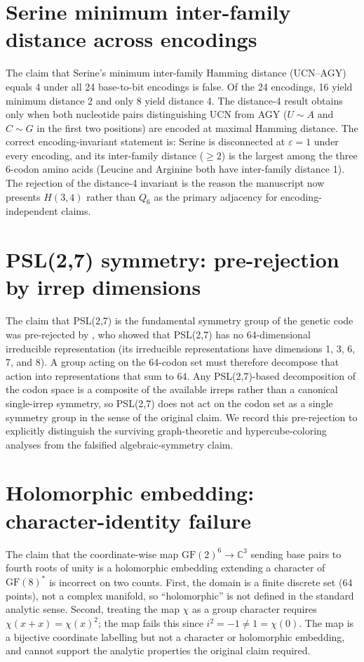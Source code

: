 \documentclass[preprint,11pt,authoryear,a4paper]{elsarticle}
\begin{document}
\section{Serine minimum inter-family distance across
encodings}\label{sec:s-serine-dist}

The claim that Serine's minimum inter-family Hamming distance (UCN--AGY)
equals 4 under all 24 base-to-bit encodings is false. Of the 24
encodings, 16 yield minimum distance 2 and only 8 yield distance 4. The
distance-4 result obtains only when both nucleotide pairs distinguishing
UCN from AGY (\(U \sim A\) and \(C \sim G\) in the first two positions)
are encoded at maximal Hamming distance. The correct encoding-invariant
statement is: Serine is disconnected at \(\varepsilon = 1\) under every
encoding, and its inter-family distance (\(\geq 2\)) is the largest
among the three 6-codon amino acids (Leucine and Arginine both have
inter-family distance 1). The rejection of the distance-4 invariant is
the reason the manuscript now presents \(H(3,4)\) rather than \(Q_{6}\)
as the primary adjacency for encoding-independent claims.

\section{PSL(2,7) symmetry: pre-rejection by irrep
dimensions}\label{sec:s-psl}

The claim that PSL(2,7) is the fundamental symmetry group of the genetic
code was pre-rejected by \citep{antoneli2011}, who showed that PSL(2,7)
has no 64-dimensional irreducible representation (its irreducible
representations have dimensions 1, 3, 6, 7, and 8). A group acting on
the 64-codon set must therefore decompose that action into
representations that sum to 64. Any PSL(2,7)-based decomposition of the
codon space is a composite of the available irreps rather than a
canonical single-irrep symmetry, so PSL(2,7) does not act on the codon
set as a single symmetry group in the sense of the original claim. We
record this pre-rejection to explicitly distinguish the surviving
graph-theoretic and hypercube-coloring analyses from the falsified
algebraic-symmetry claim.

\section{Holomorphic embedding: character-identity
failure}\label{sec:s-holo}

The claim that the coordinate-wise map
\({\text{GF}(2)}^{6} \rightarrow {\mathbb{C}}^{3}\) sending base pairs
to fourth roots of unity is a holomorphic embedding extending a
character of \({\text{GF}(8)}^{\ast}\) is incorrect on two counts.
First, the domain is a finite discrete set (64 points), not a complex
manifold, so ``holomorphic'' is not defined in the standard analytic
sense. Second, treating the map \(\chi\) as a group character requires
\(\chi(x + x) = {\chi(x)}^{2}\); the map fails this since
\(i^{2} = - 1 \neq 1 = \chi(0)\). The map is a bijective coordinate
labelling but not a character or holomorphic embedding, and cannot
support the analytic properties the original claim required.
\end{document}
